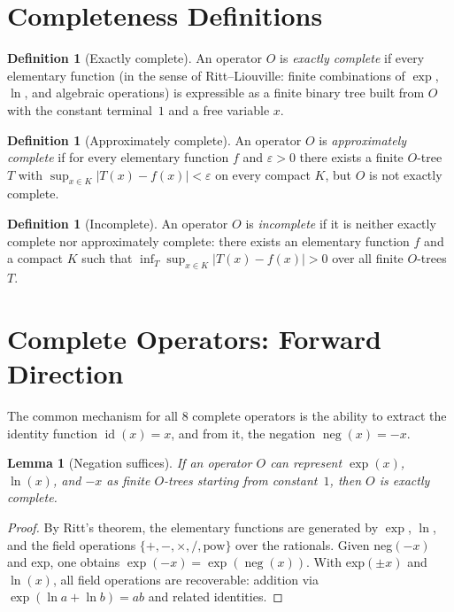 \documentclass[12pt,a4paper]{article}
\newtheorem{lemma}[theorem]{Lemma}
\theoremstyle{definition}
\newtheorem{definition}[theorem]{Definition}
\begin{document}
\section{Completeness Definitions}

\begin{definition}[Exactly complete]\label{def:exact}
An operator $O$ is \emph{exactly complete} if every elementary function
(in the sense of Ritt--Liouville: finite combinations of $\exp$, $\ln$,
and algebraic operations) is expressible as a finite binary tree built
from $O$ with the constant terminal~$1$ and a free variable $x$.
\end{definition}

\begin{definition}[Approximately complete]\label{def:approx}
An operator $O$ is \emph{approximately complete} if for every elementary
function $f$ and $\varepsilon>0$ there exists a finite $O$-tree $T$ with
$\sup_{x\in K}|T(x)-f(x)|<\varepsilon$ on every compact $K$, but $O$
is not exactly complete.
\end{definition}

\begin{definition}[Incomplete]\label{def:incomplete}
An operator $O$ is \emph{incomplete} if it is neither exactly complete
nor approximately complete: there exists an elementary function $f$ and
a compact $K$ such that $\inf_T\sup_{x\in K}|T(x)-f(x)|>0$ over all
finite $O$-trees $T$.
\end{definition}

\section{Complete Operators: Forward Direction}

The common mechanism for all 8 complete operators is the ability to
extract the identity function $\operatorname{id}(x)=x$, and from it,
the negation $\operatorname{neg}(x)=-x$.

\begin{lemma}[Negation suffices]\label{lem:neg-suffices}
If an operator $O$ can represent $\exp(x)$, $\ln(x)$, and $-x$ as finite
$O$-trees starting from constant~$1$, then $O$ is exactly complete.
\end{lemma}
\begin{proof}
By Ritt's theorem, the elementary functions are generated by $\exp$, $\ln$,
and the field operations $\{+,-,\times,/,\text{pow}\}$ over the rationals.
Given neg$(-x)$ and exp, one obtains $\exp(-x)=\exp(\operatorname{neg}(x))$.
With exp$(\pm x)$ and $\ln(x)$, all field operations are recoverable:
addition via $\exp(\ln a + \ln b) = ab$ and related identities.
\end{proof}
\end{document}
